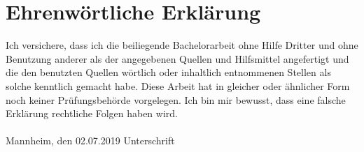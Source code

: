 \documentclass[a4paper, 11pt,titlepage,oneside,openany]{book}
\begin{document}

{}
\pagestyle{empty}

\newpage
\section*{Ehrenw\"ortliche Erkl\"arung}
Ich versichere, dass ich die beiliegende Bachelorarbeit ohne Hilfe Dritter
und ohne Benutzung anderer als der angegebenen Quellen und Hilfsmittel
angefertigt und die den benutzten Quellen w\"ortlich oder inhaltlich
entnommenen Stellen als solche kenntlich gemacht habe. Diese Arbeit
hat in gleicher oder \"ahnlicher Form noch keiner Pr\"ufungsbeh\"orde
vorgelegen. Ich bin mir bewusst, dass eine falsche Erkl\"arung rechtliche Folgen haben
wird.
\\
\\

\noindent
Mannheim, den 02.07.2019 \hspace{4cm} Unterschrift
\end{document}
